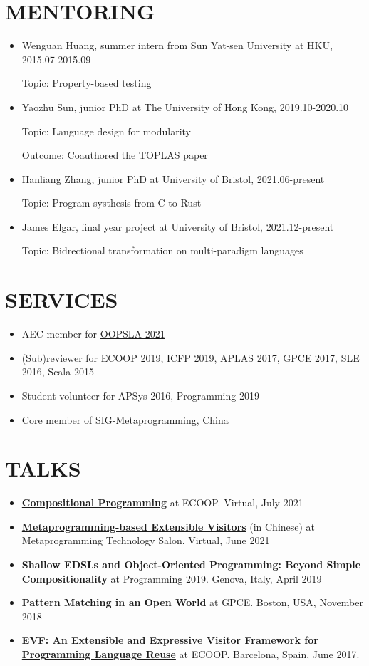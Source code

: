 \documentclass[paper=letter,fontsize=11pt]{scrartcl} %
\newcommand{\NewPart}[2]{\section*{\uppercase{#1} #2}}
\begin{document}
\NewPart{Mentoring}{}
\begin{itemize}

\item Wenguan Huang, summer intern from Sun Yat-sen University at HKU, 2015.07-2015.09

  Topic: Property-based testing

\item Yaozhu Sun, junior PhD at The University of Hong Kong, 2019.10-2020.10

  Topic: Language design for modularity

  Outcome: Coauthored the TOPLAS paper

\item Hanliang Zhang, junior PhD at University of Bristol, 2021.06-present

  Topic: Program systhesis from C to Rust

\item James Elgar, final year project at University of Bristol, 2021.12-present

  Topic: Bidrectional transformation on multi-paradigm languages
\end{itemize}

\NewPart{Services}{}
\begin{itemize}
\item AEC member for \href{https://2021.splashcon.org/committee/splash-2021-Artifacts-artifact-evaluation-committee}{OOPSLA 2021}
\item (Sub)reviewer for ECOOP 2019, ICFP 2019, APLAS 2017, GPCE 2017, SLE 2016, Scala 2015
\item Student volunteer for APSys 2016, Programming 2019
\item Core member of \href{https://gitee.com/HW-PLLab/community/tree/master/sigs/SIG-MetaProgramming}{SIG-Metaprogramming, China}
\end{itemize}

\NewPart{Talks}{}
\begin{itemize}
\item \href{https://www.youtube.com/watch?v=fBlHIXWIPhw}{\textbf{Compositional Programming}} at ECOOP. Virtual, July 2021
\item \href{https://www.bilibili.com/s/video/BV1Cy4y1M7xC}{\textbf{Metaprogramming-based Extensible Visitors}} (in Chinese) at Metaprogramming Technology Salon. Virtual, June 2021
\item \textbf{Shallow EDSLs and Object-Oriented Programming: Beyond Simple Compositionality} at Programming 2019. Genova, Italy, April 2019
\item \textbf{Pattern Matching in an Open World} at GPCE. Boston, USA, November 2018
\item \href{https://www.youtube.com/watch?v=ibGaxqNNfrs}{\textbf{EVF: An Extensible and Expressive Visitor Framework for Programming Language Reuse}} at ECOOP. Barcelona, Spain, June 2017.
\end{itemize}
\end{document}
